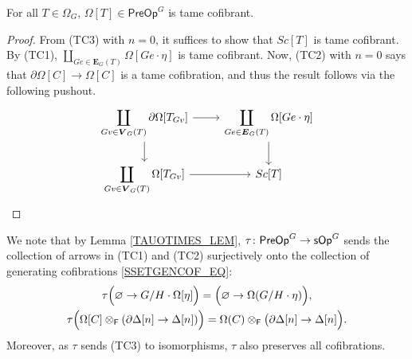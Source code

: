 \documentclass[a4paper,10pt
,draft
]{article}%
\renewcommand{\1}{\eta}%
\begin{document}
\begin{lemma}
      \label{OMEGATTAME_LEM}
      For all $T \in \Omega_G$, $\Omega[T] \in \mathsf{PreOp}^G$ is tame cofibrant.
\end{lemma}
\begin{proof}
      From (TC3) with $n=0$, it suffices to show that $Sc[T]$ is tame cofibrant.
      By (TC1), $\amalg_{Ge \in \boldsymbol{E}_G(T)} \Omega[Ge \cdot \eta]$ is tame cofibrant.
      Now, (TC2) with $n=0$ says that $\partial \Omega[C] \to \Omega[C]$ is a tame cofibration,
      and thus the result follows via the following pushout.
      \[
            \begin{tikzcd}
                  \displaystyle{
                    \coprod_{Gv \in \boldsymbol{V}_G(T)} \partial\Omega[T_{Gv}]
                  }
                  \arrow[d] \arrow[r]
                  &
                  \displaystyle{
                    \coprod_{Ge \in \boldsymbol{E}_G(T)} \Omega[Ge \cdot \eta]
                  }
                  \arrow[d]
                  \\
                  \displaystyle{
                    \coprod_{Gv \in \boldsymbol{V}_G(T)} \Omega[T_{Gv}]
                  }
                  \arrow[r]
                  &
                  Sc[T]
            \end{tikzcd}
            \]
\end{proof}


\begin{remark}
      \label{TAUCOFIB_REM}        
      We note that by Lemma \ref{TAUOTIMES_LEM}, $\tau \colon \mathsf{PreOp}^G \to \mathsf{sOp}^G$
      sends the collection of arrows in (TC1) and (TC2) surjectively onto the collection of generating cofibrations \eqref{SSETGENCOF_EQ}:
      \begin{gather*}
            \tau\Big(\varnothing \to G/H \cdot \Omega[\eta]\Big) = \Big(\varnothing \to \Omega(G/H \cdot \eta)\Big),
            \\
            \tau\Big(\Omega[C] \otimes_{\mathsf{F}} (\partial \Delta[n] \to \Delta[n])\Big) =
            \Omega(C) \otimes_{\mathsf{F}} \big(\partial \Delta[n] \to \Delta[n]\Big).
      \end{gather*}
      Moreover, as $\tau$ sends (TC3) to isomorphisms, $\tau$ also preserves all cofibrations.
\end{remark}
\end{document}
